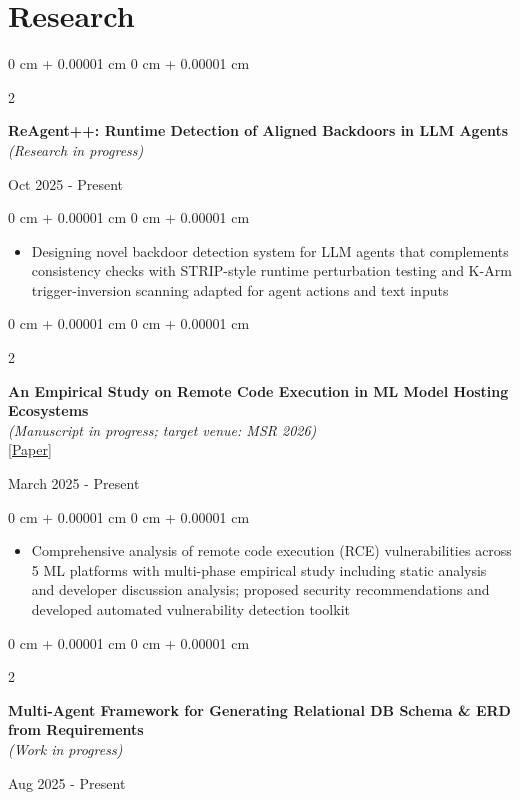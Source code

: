 \documentclass[10pt, letterpaper]{article}
\newenvironment{highlights}{
    \begin{itemize}[
        topsep=0.10 cm,
        parsep=0.10 cm,
        partopsep=0pt,
        itemsep=0pt,
        leftmargin=0 cm + 10pt
    ]
}{
    \end{itemize}
} %
\newenvironment{onecolentry}{
    \begin{adjustwidth}{
        0 cm + 0.00001 cm
    }{
        0 cm + 0.00001 cm
    }
}{
    \end{adjustwidth}
} %
\newenvironment{twocolentry}[2][]{
    \onecolentry
    \def\secondColumn{#2}
    \setcolumnwidth{\fill, 4.5 cm}
    \begin{paracol}{2}
}{
    \switchcolumn \raggedleft \secondColumn
    \end{paracol}
    \endonecolentry
} %
\begin{document}
        
    \section{Research}

    \begin{twocolentry}{Oct 2025 - Present}
    \textbf{ReAgent++: Runtime Detection of Aligned Backdoors in LLM Agents} \\
    \textit{(Research in progress)}
\end{twocolentry}

\begin{onecolentry}
    \begin{highlights}
        \item Designing novel backdoor detection system for LLM agents that complements consistency checks with STRIP-style runtime perturbation testing and K-Arm trigger-inversion scanning adapted for agent actions and text inputs
    \end{highlights}
\end{onecolentry}

    \begin{twocolentry}{March 2025 - Present}
    \textbf{An Empirical Study on Remote Code Execution in ML Model Hosting Ecosystems} \\
    \textit{(Manuscript in progress; target venue: MSR 2026)} \\
    \href{https://tanzimhromel.com/assets/pdf/ml-rce-study.pdf}{[Paper]}
\end{twocolentry}

\begin{onecolentry}
    \begin{highlights}
        \item Comprehensive analysis of remote code execution (RCE) vulnerabilities across 5 ML platforms with multi-phase empirical study including static analysis and developer discussion analysis; proposed security recommendations and developed automated vulnerability detection toolkit
    \end{highlights}
\end{onecolentry}

\begin{twocolentry}{
    Aug 2025 - Present
}

\textbf{Multi-Agent Framework for Generating Relational DB Schema \& ERD from Requirements} \\
\textit{(Work in progress)}
    
\end{twocolentry}
\end{document}
